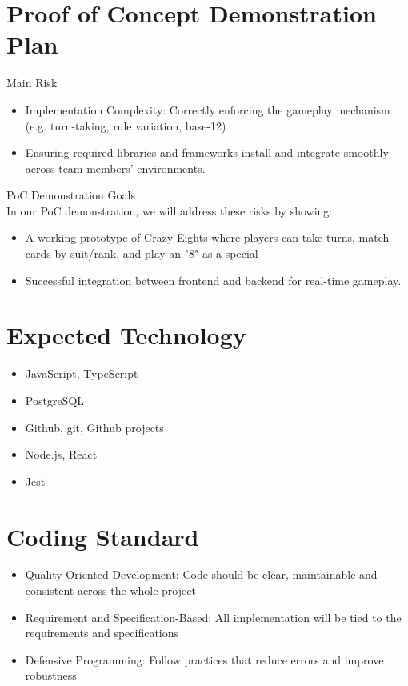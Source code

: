 \documentclass{article}
\begin{document}
\section{Proof of Concept Demonstration Plan}

Main Risk

\begin{itemize}
	\item Implementation Complexity: Correctly enforcing the gameplay mechanism (e.g. turn-taking,  rule variation, base-12)
	\item Ensuring required libraries and frameworks install and integrate smoothly across team members’ environments.
	
\end{itemize}
PoC Demonstration Goals \\In our PoC demonstration, we will address these risks by showing:
\begin{itemize}
	\item A working prototype of Crazy Eights where players can take turns, match cards by suit/rank, and play an "8" as a special 
	\item Successful integration between frontend and backend for real-time gameplay.
\end{itemize}

\section{Expected Technology}


\begin{itemize}
\item JavaScript, TypeScript
\item PostgreSQL
\item Github, git, Github projects
\item Node.js,  React
\item Jest
\end{itemize}


\section{Coding Standard}

\begin{itemize}
	\item Quality-Oriented Development: Code should be clear, maintainable and consistent across the whole project
	\item Requirement and Specification-Based: All implementation will be tied to the requirements and specifications
	\item Defensive Programming: Follow practices that reduce errors and improve robustness
\end{itemize}
\end{document}
